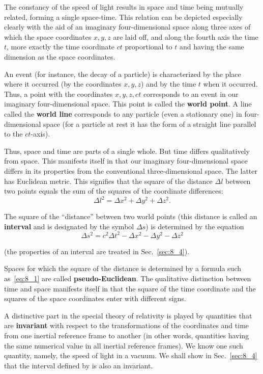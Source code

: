 The constancy of the speed of light results in space and time being mutually related, forming a single space-time. This relation can be depicted especially clearly with the aid of an imaginary four-dimensional space along three axes of which the space coordinates $x, y, z$ are laid off, and along the fourth axis the time $t$, more exactly the time coordinate $ct$ proportional to $t$ and having the same dimension as the space coordinates.

An event (for instance, the decay of a particle) is characterized by the place where it occurred (by the coordinates $x, y, z$) and by the time $t$ when it occurred. Thus, a point with the coordinates $x, y, z, ct$ corresponds to an event in our imaginary four-dimensional space. This point is called the \textbf{world point}. A line called the \textbf{world line} corresponds to any particle (even a stationary one) in four-dimensional space (for a particle at rest it has the form of a straight line parallel to the $ct$-axis).

Thus, space and time are parts of a single whole. But time differs qualitatively from space. This manifests itself in that our imaginary four-dimensional space differs in its properties from the conventional three-dimensional space. The latter has Euclidean metric. This signifies that the square of the distance $\Delta l$ between two points equals the sum of the squares of the coordinate differences:
\begin{equation*}
	\Delta l^2 = \Delta x^2 + \Delta y^2 + \Delta z^2.
\end{equation*}

The square of the ``distance'' between two world points (this distance is called an \textbf{interval} and is designated by the symbol $\Delta s$) is determined by the equation
\begin{equation}\label{eq:8_1}
	\Delta s^2 = c^2\Delta t^2 - \Delta x^2 - \Delta y^2 - \Delta z^2
\end{equation}

\noindent
(the properties of an interval are treated in Sec.~\ref{sec:8_4}).

Spaces for which the square of the distance is determined by a formula such as~\eqref{eq:8_1} are called \textbf{pseudo-Euclidean}. The qualitative distinction between time and space manifests itself in that the square of the time coordinate and the squares of the space coordinates enter  with different signs.

A distinctive part in the special theory of relativity is played by quantities that are \textbf{invariant} with respect to the transformations of the coordinates and time from one inertial reference frame to another (in other words, quantities having the same numerical value in all inertial reference frames). We know one such quantity, namely, the speed of light in a vacuum. We shall show in Sec.~\ref{sec:8_4} that the interval defined by  is also an invariant.


